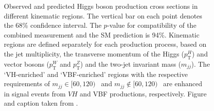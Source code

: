 
\begin{figure}
  \caption{Observed and predicted Higgs boson production cross sections in different
  kinematic regions. The vertical bar on each point denotes the 68\% confidence interval. The $p$-value for compatibility of the combined measurement and the SM prediction is 94\%. Kinematic regions are defined separately for each production process, based on the jet multiplicity, the transverse momentum of the Higgs ($p_{\textrm{T}}^H$) and vector bosons ($p_{\textrm{T}}^W$ and $p_{\textrm{T}}^Z$) and the two-jet invariant mass ($m_{jj}$).
The `VH-enriched' and `VBF-enriched' regions with the respective requirements of $m_{jj}\in[60, 120)$ \GeV\ and $m_{jj}\notin[60,120)$ \GeV\ are enhanced in signal events from $VH$ and VBF productions, respectively. Figure and caption taken from .
  }
  \label{fig:stxs-stage12}
\end{figure}

